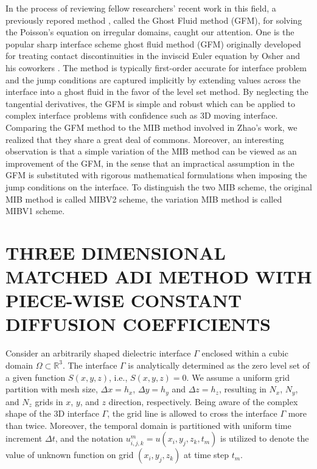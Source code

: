 \documentclass[dissertation]{uathesis}
\begin{document}
\begin{body}
In the process of reviewing fellow researchers' recent work in this field, a previously repored method \cite{liu2000, liu2017second}, called the Ghost Fluid method (GFM), for solving the Poisson's equation on irregular domains, caught our attention. One is the popular sharp interface scheme ghost fluid method (GFM) originally developed for treating contact discontinuities in the inviscid Euler equation by Osher and his coworkers \cite{fedkiw1999non}. The method is typically first-order accurate for interface problem and the jump conditions are captured implicitly by extending values across the interface into a ghost fluid in the favor of the level set method. By neglecting the tangential derivatives, the GFM is simple and robust which can be applied to complex interface problems  with confidence such as 3D moving interface. Comparing the GFM method to the MIB method involved in Zhao's work, we realized that they share a great deal of commons. Moreover, an interesting observation is that a simple variation of the MIB method can be viewed as an improvement of the GFM, in the sense that an impractical assumption in the GFM is substituted with rigorous mathematical formulations when imposing the jump conditions on the interface. To distinguish the two MIB scheme, the original MIB method is called MIBV2 scheme, the variation MIB method is called MIBV1 scheme.

% 
\chapter{\MakeUppercase{Three dimensional matched ADI method with piece-wise constant diffusion coefficients}}

Consider an arbitrarily shaped dielectric interface $\Gamma$ 
enclosed within a cubic domain $\Omega \subset \mathbb{R}^{3}$. 
The interface $\Gamma$ is analytically determined as the zero level set of a given
function $S(x,y,z)$, i.e., $S(x,y,z)=0$. 
We assume a uniform grid partition with mesh size, $\Delta x=h_{x}$, $\Delta y=h_{y}$ and $\Delta z=h_{z}$, resulting in $N_{x}$, $N_{y}$, and $N_{z}$ grids in $x$, $y$, and $z$ direction, respectively. Being aware of the complex shape of the 3D interface $\Gamma$, the grid line is allowed to cross the interface $\Gamma$ more than twice. Moreover, the temporal domain is partitioned with uniform time increment $\Delta t$, and the notation $u^{m}_{i,j,k} = u(x_{i},y_{j},z_{k},t_{m})$ is utilized to denote the value of unknown function on grid $(x_{i},y_{j},z_{k})$ at time step  $t_{m}$.


\end{body}
\end{document}
